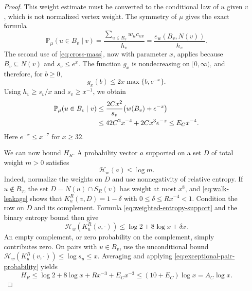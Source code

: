 \begin{proof}
This weight estimate must be converted to the conditional law of $u$
given $v$, which is not normalized vertex weight.  The symmetry of $\mu$
gives the exact formula
\[
 \mathbb P_\mu(u\in B_v\mid v)
 =\frac{\sum_{u\in B_v}w_uc_{uv}}{h_v}
 =\frac{e_w(B_v,N(v))}{h_v}.
\]
The second use of \eqref{eq:cross-mass}, now with parameter $x$,
applies because $B_v\subseteq N(v)$ and $s_v\le e^x$.  The function $g_x$
is nondecreasing on $[0,\infty)$, and therefore, for $b\ge0$,
\[
 g_x(b)\le2x\max\{b,e^{-x}\}.
\]
Using $h_v\ge s_v/x$ and $s_v\ge x^{-1}$, we obtain
\begin{align}
 \mathbb P_\mu(u\in B_v\mid v)
 &\le\frac{2Cx^2}{s_v}\bigl(w(B_v)+e^{-x}\bigr)\notag\\
 &\le42C^2x^{-4}+2Cx^3e^{-x}
 \le E_Cx^{-4}.
 \label{eq:exceptional-pair-probability}
\end{align}
Here $e^{-x}\le x^{-7}$ for $x\ge32$.

We can now bound $H_R$.  A probability vector $a$ supported on a set $D$
of total weight $m>0$ satisfies
\begin{equation}
 \mathcal H_w(a)\le\log m.
 \label{eq:weighted-entropy-support}
\end{equation}
Indeed, normalize the weights on $D$ and use nonnegativity of relative
entropy.  If $u\notin B_v$, the set $D=N(u)\cap S_R(v)$ has weight at most
$x^8$, and \eqref{eq:walk-leakage} shows that
$K_u^R(v,D)=1-\delta$ with $0\le\delta\le Rx^{-4}<1$.  Condition the
row on $D$ and its complement.  Formula \eqref{eq:weighted-entropy-support}
and the binary entropy bound then give
\[
 \mathcal H_w(K_u^R(v,\cdot))
 \le\log2+8\log x+\delta x.
\]
An empty complement, or zero probability on the complement, simply
contributes zero.  On pairs with $u\in B_v$, use the unconditional bound
$\mathcal H_w(K_u^R(v,\cdot))\le\log s_u\le x$.  Averaging and applying
\eqref{eq:exceptional-pair-probability} yields
\[
 H_R\le\log2+8\log x+Rx^{-3}+E_Cx^{-3}
 \le(10+E_C)\log x=A_C\log x.
\]


\end{proof}
